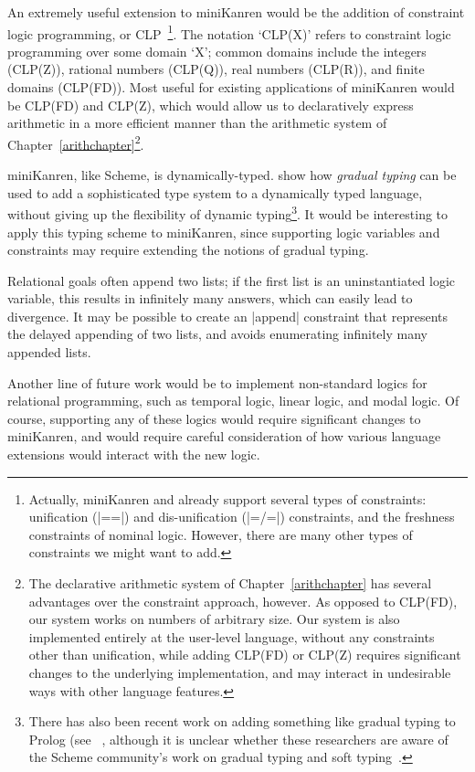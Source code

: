 An extremely useful extension to miniKanren would be the addition of
constraint logic programming, or
CLP~\cite{DBLP:journals/jlp/JaffarM94}\footnote{Actually, miniKanren
  and \alphakanrensp already support several types of constraints:
  unification (\scheme|==|) and dis-unification (\scheme|=/=|)
  constraints, and the freshness constraints of nominal logic.
  However, there are many other types of constraints we might want to
  add.}.  The notation `CLP(X)' refers to constraint logic programming
over some domain `X'; common domains include the integers (CLP(Z)),
rational numbers (CLP(Q)), real numbers (CLP(R)), and finite domains
(CLP(FD)).  Most useful for existing applications of miniKanren would
be CLP(FD) and CLP(Z), which would allow us to declaratively express
arithmetic in a more efficient manner than the arithmetic system of
Chapter~\ref{arithchapter}\footnote{The declarative arithmetic system
  of Chapter~\ref{arithchapter} has several advantages over the
  constraint approach, however.  As opposed to CLP(FD), our system
  works on numbers of arbitrary size.  Our system is also implemented
  entirely at the user-level language, without any constraints other
  than unification, while adding CLP(FD) or CLP(Z) requires
  significant changes to the underlying implementation, and may
  interact in undesirable ways with other language features.}.

miniKanren, like Scheme, is dynamically-typed. \citet{siek06:gradual}
show how \emph{gradual typing} can be used to add a sophisticated type
system to a dynamically typed language, without giving up the
flexibility of dynamic typing\footnote{There has also been recent work
  on adding something like gradual typing to Prolog (see
  ~\cite{towardstypedprolog}, although it is unclear whether these
  researchers are aware of the Scheme community's work on gradual
  typing and soft typing~\cite{softtyping}.}.  It would be interesting
to apply this typing scheme to miniKanren, since supporting logic
variables and constraints may require extending the notions of gradual
typing.

Relational goals often append two lists; if the first list is an
uninstantiated logic variable, this results in infinitely many
answers, which can easily lead to divergence. It may be possible to
create an \scheme|append| constraint that represents the delayed
appending of two lists, and avoids enumerating infinitely many
appended lists.

Another line of future work would be to implement non-standard logics
for relational programming, such as temporal logic, linear logic, and
modal logic.  Of course, supporting any of these logics would require
significant changes to miniKanren, and would require careful
consideration of how various language extensions would interact with
the new logic.

